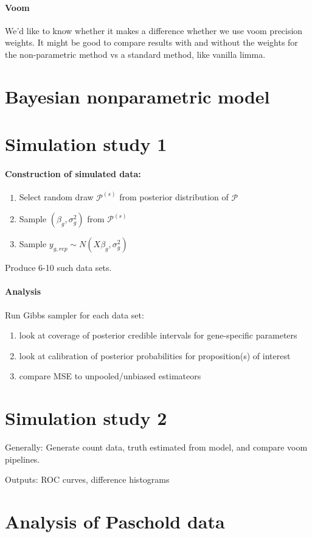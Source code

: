 \paragraph{Voom}
We'd like to know whether it makes a difference whether we use voom precision weights. It might be good to compare results with and without the weights for the non-parametric method vs a standard method, like vanilla limma.

\section{Bayesian nonparametric model}

\section{Simulation study 1}

\paragraph{Construction of simulated data:}
\begin{enumerate}
\item Select random draw $\mathcal{P}^{(s)}$ from posterior distribution of $\mathcal{P}$

\item Sample $(\beta_g,\sigma^2_g)$ from $\mathcal{P}^{(s)}$

\item Sample $y_{g,rep} \sim N(X\beta_g,\sigma^2_g)$
\end{enumerate}
Produce 6-10 such data sets.\\

\paragraph{Analysis}

Run Gibbs sampler for each data set:
\begin{enumerate}
\item look at coverage of posterior credible intervals for gene-specific parameters

\item look at calibration of posterior probabilities for proposition(s) of interest

\item compare MSE to unpooled/unbiased estimateors
\end{enumerate}
\section{Simulation study 2}
Generally: Generate count data, truth estimated from model, and compare voom pipelines.

Outputs: ROC curves, difference histograms

\section{Analysis of Paschold data}




